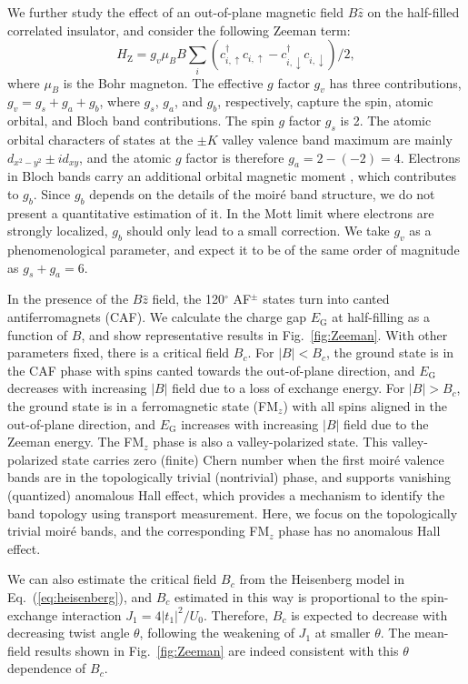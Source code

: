 \documentclass[aps,prx,floatfix,twocolumn]{revtex4-1}
\begin{document}
	
	We further study the effect of an out-of-plane magnetic field $B \hat{z}$ on the half-filled correlated insulator, and consider the following Zeeman term:
	\begin{equation} \label{HZ}
	    H_{\text{Z}}=g_v \mu_B B \sum_{i} (c_{i,\uparrow}^{\dagger}c_{i,\uparrow}-c_{i,\downarrow}^{\dagger}c_{i,\downarrow})/2,
	\end{equation}
	where $\mu_B$ is the Bohr magneton. The effective $g$ factor $g_v$ has three contributions, $g_v=g_s+g_a+g_b$, where $g_s$, $g_a$, and $g_b$, respectively, capture the spin, atomic orbital, and Bloch band contributions. The spin $g$ factor $g_s$ is 2. The atomic orbital characters of states at the $\pm K$ valley valence band maximum are mainly $d_{x^2-y^2} \pm i d_{xy}$, and the atomic $g$ factor is therefore $g_a=2-(-2)=4$. Electrons in Bloch bands carry an additional orbital magnetic moment \cite{xiao2007valleycontrasting}, which contributes to $g_b$. Since $g_b$ depends on the details of the moir\'e band structure, we do not present a quantitative estimation of it. In the Mott limit where electrons are strongly localized, $g_b$ should only lead to a small correction. We take  $g_v$ as a phenomenological parameter, and expect it to be of the same order of magnitude as $g_s+g_a=6$.
	
	In the presence of the $B \hat{z}$ field, the 120$^\circ$ AF$^{\pm}$ states turn into canted antiferromagnets (CAF). We calculate the charge gap $E_\text{G}$ at half-filling as a function of $B$, and show representative results in Fig.~\ref{fig:Zeeman}. With other parameters fixed, there is a critical field $B_c$. For $|B|<B_c$, the ground state is in the CAF phase with spins canted towards the out-of-plane direction, and $E_\text{G}$ decreases with increasing $|B|$ field due to a loss of exchange energy. For $|B|>B_c$, the ground state is in a ferromagnetic state (FM$_z$) with all spins aligned in the out-of-plane direction, and  $E_\text{G}$ increases with increasing $|B|$ field due to the Zeeman energy. The FM$_z$ phase is also a valley-polarized state. This valley-polarized state carries zero (finite) Chern number when the first moir\'e valence bands are in the topologically trivial (nontrivial) phase, and supports vanishing (quantized) anomalous Hall effect, which provides a mechanism to identify the band topology using transport measurement. Here, we focus on the topologically trivial moir\'e bands, and the corresponding FM$_z$ phase has no anomalous Hall effect.
	
	 We can also estimate the critical field $B_c$ from the Heisenberg model in Eq.~(\ref{eq:heisenberg}), and $B_c$ estimated in this way is proportional to the spin-exchange interaction $J_1=4|t_1|^2/U_0$. Therefore, $B_c$ is expected to decrease with decreasing twist angle $\theta$, following the weakening of $J_1$ at smaller $\theta$. The mean-field results shown in Fig.~\ref{fig:Zeeman} are indeed consistent with this $\theta$ dependence of $B_c$. 
	
\end{document}

